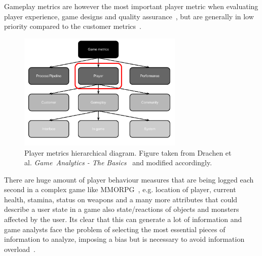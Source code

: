 Gameplay metrics are however the most important player metric when evaluating player experience, game designs and quality assurance~\citep{Kim:2008Tracking, Drachen:2012, Drachen:2011Evaluating}, but are generally in low priority compared to the customer metrics~\citep{Drachen:2013Basics}.
\begin{figure}[here]
\centerline{\includegraphics[width=0.7\textwidth]{Figures/Hierarchical_diagram_gamemetrics.pdf}}
\caption{Player metrics hierarchical diagram. Figure taken from Drachen et al. \textit{Game~Analytics - The Basics}~\citep{Drachen:2013Basics} and modified accordingly. }
\label{fig:gamemetrics}
\end{figure}
There are huge amount of player behaviour measures that are being logged each second in a complex game like MMORPG~\citep{Kim:2008Tracking, Drachen:2011Evaluating}, e.g. location of player, current health, stamina, status on weapons and a many more attributes that could describe a user state in a game also state/reactions of objects and monsters affected by the user. Its clear that this can generate a lot of information and game analysts face the problem of selecting the most essential pieces of information to analyze, imposing a bias but is necessary to avoid information overload~\citep{Drachen:2013Basics}. 

